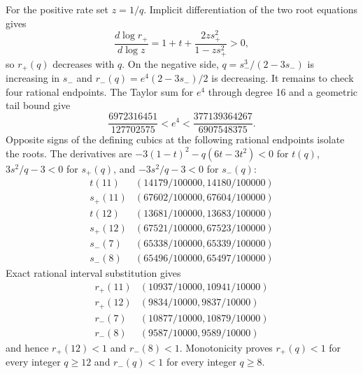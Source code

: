 For the positive rate set $z=1/q$.  Implicit differentiation of the two
root equations gives
\[
 \frac{d\log r_+}{d\log z}
       =1+t+\frac{2zs_+^2}{1-zs_+^2}>0,
\]
so $r_+(q)$ decreases with $q$.  On the negative side,
$q=s_-^3/(2-3s_-)$ is increasing in $s_-$ and
$r_-(q)=e^4(2-3s_-)/2$ is decreasing.  It remains to check four rational
endpoints.  The Taylor sum for $e^4$ through degree 16 and a geometric tail
bound give
\[
 \frac{6972316451}{127702575}<e^4<\frac{377139364267}{6907548375}.
\]
Opposite signs of the defining cubics at the following rational endpoints
isolate the roots.  The derivatives are
$-3(1-t)^2-q(6t-3t^2)<0$ for $t(q)$,
$3s^2/q-3<0$ for $s_+(q)$, and $-3s^2/q-3<0$ for $s_-(q)$:
\[
\begin{array}{c|c}
 t(11)&(14179/100000,14180/100000)\\
 s_+(11)&(67602/100000,67604/100000)\\
 t(12)&(13681/100000,13683/100000)\\
 s_+(12)&(67521/100000,67523/100000)\\
 s_-(7)&(65338/100000,65339/100000)\\
 s_-(8)&(65496/100000,65497/100000)
\end{array}
\]
Exact rational interval substitution gives
\[
\begin{array}{c|c}
 r_+(11)&(10937/10000,10941/10000)\\
 r_+(12)&(9834/10000,9837/10000)\\
 r_-(7)&(10877/10000,10879/10000)\\
 r_-(8)&(9587/10000,9589/10000)
\end{array}
\]
and hence $r_+(12)<1$ and $r_-(8)<1$.  Monotonicity proves
$r_+(q)<1$ for every integer $q\ge12$ and $r_-(q)<1$ for every integer
$q\ge8$.

